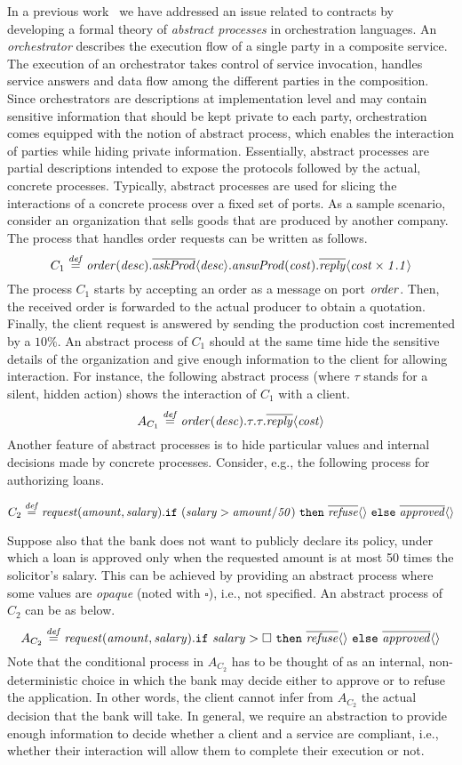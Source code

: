 \documentclass[submission,copyright,creativecommons]{eptcs}
\newcommand{\opaque}{\square}
\newcommand{\bydef}{\stackrel{\scriptstyle{\it def}}{=}}
\newcommand{\outp}[2]{\overline{#1}\langle{#2}\rangle}
\newcommand{\inp}[2]{#1(#2)}
\newcommand{\ifte}[3]{{\tt if}\ #1\ {\tt then }\ #2\ {\tt else }\ #3}
\begin{document}
In a previous work~\cite{BM:APOL} we have addressed an issue related to 
contracts
by developing a formal theory of \emph{abstract processes} in 
orchestration languages.
An {\em orchestrator} describes the execution flow of a single party in 
a composite
service. The execution of an orchestrator takes control of service 
invocation, handles
service answers and data flow among the different parties in the 
composition. Since
orchestrators are descriptions at implementation level and may contain 
sensitive information
that should be kept private to each party, orchestration comes equipped 
with the notion of
abstract process, which enables the interaction of parties while hiding 
private information.
Essentially, abstract processes are partial descriptions intended to 
expose the protocols
followed by the actual, concrete processes. Typically, abstract 
processes are used for slicing
the interactions of a concrete process over a fixed set of ports. 
As a sample scenario, consider an organization that sells goods that are produced
by another company. The process that handles order requests can be written as follows.
\[
{C_1}\bydef\inp{\it order}{\it desc}.\outp{\it askProd}{\it desc}.\inp{\it
  answProd}{\it cost}.\outp{\it reply}{cost\times1.1}
\]
The process ${C_1}$ starts by accepting an order as a message on port ${\it order}$.  
Then, the received order is forwarded to the actual producer  to obtain a 
quotation. Finally, the client request is answered by sending the production cost 
incremented by a $10\%$. An abstract process of ${C_1}$ should at the same time hide 
the sensitive details of the organization and give enough information to the client for 
allowing interaction. For instance, the following abstract process (where 
$\tau$ stands for a silent, hidden action) shows the interaction of ${C_1}$ with a client.
\[ {A_{C_1}}\bydef\inp{\it order}{\it desc}.\tau.\tau.\outp{\it
  reply}{cost}
\]
Another feature of abstract processes is to hide particular values and 
internal decisions made by concrete processes. Consider, e.g., the following 
process for authorizing loans.
\begin{small}
\[
{C_2}\bydef\inp{\it request}{\it amount,salary}.\ifte{( salary  > amount / 50)}{\outp{\it refuse}{}}{\outp{\it approved}{}}
\]
\end{small}
 Suppose also that the bank does not want to publicly declare its policy, under which 
 a loan is approved only when the requested amount is at most 50 times the solicitor's salary. 
 This can be achieved by providing an abstract process where some values are
 {\it opaque} (noted with $\opaque$), i.e., not specified. An abstract process of ${C_2}$ can be as below.
\[
 {A_{C_2}}\bydef\inp{\it request}{\it amount,salary}.\ifte{salary > \opaque}
  {\outp{\it refuse}{}}{\outp{\it approved}{}}
\]
Note that the conditional process in ${A_{C_2}}$ has to be thought of as an
internal, non-deterministic choice in which the bank may decide either
to approve or to refuse the application. In other words, the client cannot
infer from  ${A_{C_2}}$  the actual decision that the bank will take. In general, we 
require an abstraction to provide enough information to decide whether a client and a 
service are compliant, i.e., whether their interaction will allow them to complete their 
execution or not.
\end{document}
